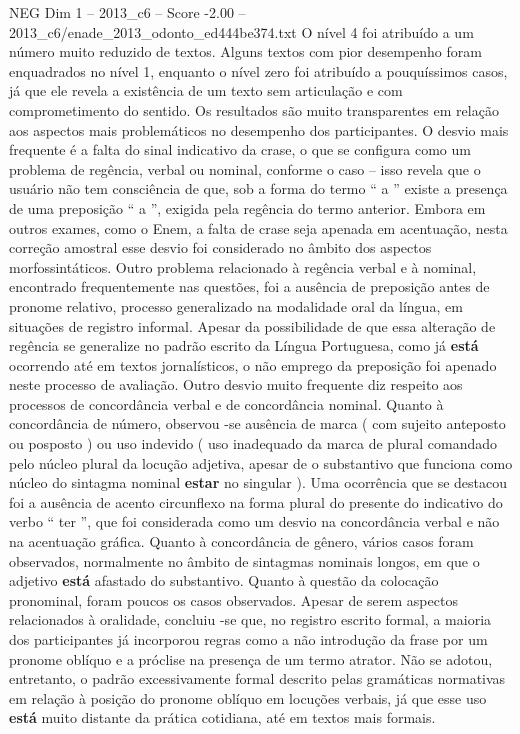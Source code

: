 \begin{textsample}{NEG Dim 1 – 2013\_c6 – Score -2.00 – 2013\_c6/enade\_2013\_odonto\_ed444be374.txt}
O nível 4 foi atribuído a um número muito reduzido de textos.
Alguns textos com pior desempenho foram enquadrados no nível 1, enquanto o nível zero foi atribuído a pouquíssimos casos, já que ele revela a existência de um texto sem articulação e com comprometimento do sentido.
Os resultados são muito transparentes em relação aos aspectos mais problemáticos no desempenho dos participantes.
O desvio mais frequente é a falta do sinal indicativo da crase, o que se configura como um problema de regência, verbal ou nominal, conforme o caso – isso revela que o usuário não tem consciência de que, sob a forma do termo “ a ” existe a presença de uma preposição “ a ”, exigida pela regência do termo anterior.
Embora em outros exames, como o Enem, a falta de crase seja apenada em acentuação, nesta correção amostral esse desvio foi considerado no âmbito dos aspectos morfossintáticos.
Outro problema relacionado à regência verbal e à nominal, encontrado frequentemente nas questões, foi a ausência de preposição antes de pronome relativo, processo generalizado na modalidade oral da língua, em situações de registro informal.
Apesar da possibilidade de que essa alteração de regência se generalize no padrão escrito da Língua Portuguesa, como já \textbf{está} ocorrendo até em textos jornalísticos, o não emprego da preposição foi apenado neste processo de avaliação.
Outro desvio muito frequente diz respeito aos processos de concordância verbal e de concordância nominal.
Quanto à concordância de número, observou -se ausência de marca ( com sujeito anteposto ou posposto ) ou uso indevido ( uso inadequado da marca de plural comandado pelo núcleo plural da locução adjetiva, apesar de o substantivo que funciona como núcleo do sintagma nominal \textbf{estar} no singular ).
Uma ocorrência que se destacou foi a ausência de acento circunflexo na forma plural do presente do indicativo do verbo “ ter ”, que foi considerada como um desvio na concordância verbal e não na acentuação gráfica.
Quanto à concordância de gênero, vários casos foram observados, normalmente no âmbito de sintagmas nominais longos, em que o adjetivo \textbf{está} afastado do substantivo.
Quanto à questão da colocação pronominal, foram poucos os casos observados.
Apesar de serem aspectos relacionados à oralidade, concluiu -se que, no registro escrito formal, a maioria dos participantes já incorporou regras como a não introdução da frase por um pronome oblíquo e a próclise na presença de um termo atrator.
Não se adotou, entretanto, o padrão excessivamente formal descrito pelas gramáticas normativas em relação à posição do pronome oblíquo em locuções verbais, já que esse uso \textbf{está} muito distante da prática cotidiana, até em textos mais formais.

\end{textsample}
